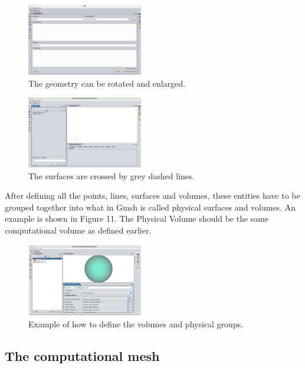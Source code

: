 \documentclass[a4paper, 11pt]{article}
\begin{document}
\begin{figure}[!ht]
    \centering
    \includegraphics[width=0.45\textwidth]{fig9.jpg}
    \caption{The geometry can be rotated and enlarged.}
\end{figure}

\begin{figure}[!ht]
    \centering
    \includegraphics[width=0.45\textwidth]{fig10.jpg}
    \caption{The surfaces are crossed by grey dashed lines.}
\end{figure}

After defining all the points, lines, surfaces and volumes, these entities have to be grouped together into what in Gmsh is called physical surfaces and volumes. An example is shown in Figure 11. The Physical Volume should be the same computational volume as defined earlier.

\begin{figure}[!ht]
    \centering
    \includegraphics[width=0.45\textwidth]{fig11.jpg}
    \caption{Example of how to define the volumes and physical groups.}
\end{figure}

\subsection{The computational mesh}
\end{document}
